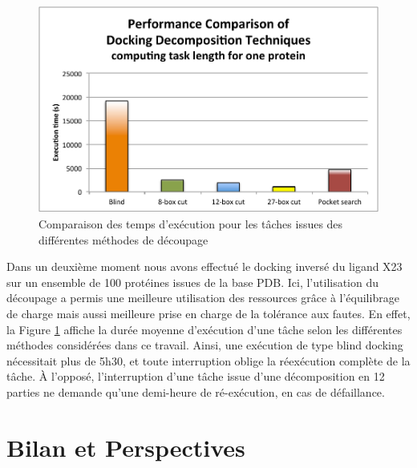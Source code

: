 \begin{figure}
	\centering
		\includegraphics[width=0.5\linewidth]{images/Romain/fig7-color}
		\caption{Comparaison des temps d'exécution pour les tâches issues des différentes méthodes de découpage}\label{fig:performance} %

\end{figure}


 
Dans un deuxième moment nous avons effectué le docking inversé du ligand X23 sur un ensemble de 100 protéines issues de la base PDB. Ici, l'utilisation du découpage a permis une  meilleure utilisation des ressources grâce à l'équilibrage de charge %
mais aussi meilleure prise en charge de la tolérance aux fautes. En effet, la Figure \ref{fig:performance} affiche la durée moyenne d'exécution d'une tâche selon les différentes méthodes considérées dans ce travail. Ainsi, une exécution de type blind docking nécessitait plus de 5h30, et toute interruption oblige la réexécution complète de la tâche. À l'opposé, l'interruption d'une tâche issue d'une décomposition en 12 parties ne demande qu'une demi-heure de ré-exécution, en cas de défaillance.  


 

\section{Bilan et Perspectives} \label{sec:disc}








